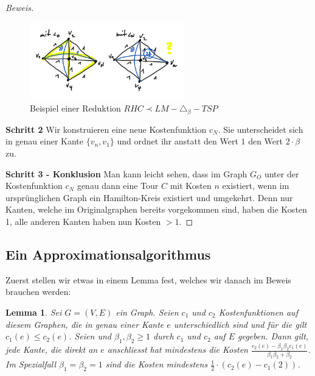 \documentclass[a4paper,11pt]{scrreprt}
\begin{document}
\begin{proof}[Beweis]
\begin{figure}[H]
\centering
\includegraphics[width=0.6\textwidth]{rhc_reduction_step3.png}
\caption{Beispiel einer Reduktion $RHC \prec LM-\triangle_\beta-TSP$}
\label{fig:rhc-reduction-step3}
\end{figure}

\textbf{Schritt 2} Wir konstruieren eine neue Kostenfunktion $c_N$. Sie unterscheidet sich in genau einer Kante $\{v_n, v_1\}$ und ordnet ihr anstatt den Wert $1$ den Wert $2 \cdot \beta$ zu.

\textbf{Schritt 3 - Konklusion} Man kann leicht sehen, dass im Graph $G_O$ unter der Kostenfunktion $c_N$ genau dann eine Tour $C$ mit Kosten $n$ existiert, wenn im ursprünglichen Graph ein Hamilton-Kreis existiert und umgekehrt. Denn nur Kanten, welche im Originalgraphen bereits vorgekommen sind, haben die Kosten 1, alle anderen Kanten haben nun Kosten $> 1$. 
\end{proof}

\subsection{Ein Approximationsalgorithmus}

Zuerst stellen wir etwas in einem Lemma fest, welches wir danach im Beweis brauchen werden:

\newtheorem{lemma1}{Lemma}

\begin{lemma1}
Sei $G = (V, E)$ ein Graph. Seien $c_1$ und $c_2$ Kostenfunktionen auf diesem Graphen, die in genau einer Kante $e$ unterschiedlich sind und für die gilt $c_1(e) \le c_2(e)$. Seien und $\beta_1, \beta_2 \ge 1$ durch $c_1$ und $c_2$ auf $E$ gegeben. Dann gilt, jede Kante, die direkt an $e$ anschliesst hat mindestens die Kosten $\frac{c_2(e) - \beta_1\beta_2 c_1(e)}{\beta_1\beta_2 + \beta_2}$. Im Spezialfall $\beta_1 = \beta_2 = 1$ sind die Kosten mindestens $\frac{1}{2} \cdot (c_2(e) - c_1(2))$.
\label{lemma:1}
\end{lemma1}
\end{document}
